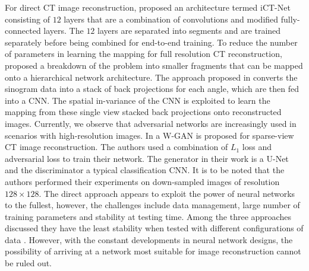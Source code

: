 For direct \ac{CT} image reconstruction, \cite{li2019learning} proposed an architecture termed iCT-Net consisting of $12$ layers that are a combination of convolutions and modified fully-connected layers. The $12$ layers are separated into segments and are trained separately before being combined for end-to-end training. To reduce the number of parameters in learning the mapping for full resolution \ac{CT} reconstruction, \cite{fu2019hierarchical} proposed a breakdown of the problem into smaller fragments that can be mapped onto a hierarchical network architecture. The approach proposed in \cite{ye2018deep} converts the sinogram data into a stack of back projections for each angle, which are then fed into a \ac{CNN}. The spatial in-variance of the \ac{CNN} is exploited to learn the mapping from these single view stacked back projections onto reconstructed images. Currently, we observe that adversarial networks are increasingly used in scenarios with high-resolution images. In \cite{thaler2018sparse} a W-GAN is proposed for sparse-view \ac{CT} image reconstruction. The authors used a combination of $L_1$ loss and adversarial loss to train their network. The generator in their work is a U-Net and the discriminator a typical classification \ac{CNN}. It is to be noted that the authors performed their experiments on down-sampled images of resolution $128\times 128$. The direct approach appears to exploit the power of neural networks to the fullest, however, the challenges include data management, large number of training parameters and stability at testing time. Among the three approaches discussed they have the least stability when tested with different configurations of data \cite{antun2020instabilities}. However, with the constant developments in neural network designs, the possibility of arriving at a network most suitable for image reconstruction cannot be ruled out.





